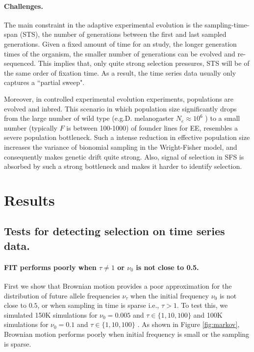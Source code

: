 \documentclass[11pt]{article}
\begin{document}
\paragraph{Challenges.}
The main constraint in the adaptive experimental evolution is the 
sampling-time-span (STS), the number of generations 
between the first and last sampled generations. Given a 
fixed amount of time for an study, the longer generation times of the organism, 
the smaller number of generations can be evolved and re-sequenced. 
This implies that, only quite strong selection pressures, STS will be of the 
same order of fixation time. As a result, the time series data usually only 
captures a ``partial sweep".

Moreover, in controlled experimental evolution experiments, populations are
evolved and 
inbred. This scenario in which population 
size 
significantly drops from the large number of wild type (e.g.D. melanogaster 
$N_e\approx10^6$ ) to a small number (typically $F$ is between 100-1000) of 
founder lines for EE, resembles a severe population bottleneck. 
Such a intense reduction in effective population size increases the variance of 
bionomial sampling in the Wright-Fisher model, and consequently makes genetic 
drift quite strong. Also, signal of selection in SFS is absorbed by such a 
strong bottleneck and makes it harder to identify selection.

\section{Results}
\subsection{Tests for detecting selection on time series data.}
\paragraph{FIT performs poorly when $\tau \neq 1$ or $\nu_0$ is not close to 
0.5.}
First we show that Brownian motion provides a poor 
approximation for the distribution of future allele frequencies $\nu_{\tau}$
when the initial frequency $\nu_0$ is not close to $0.5$, or when sampling in 
time is sparse i.e., 
$\tau>1$. 
To test this, we simulated 150K simulations for $\nu_0=0.005$ and 
$\tau\in\{1,10,100\}$ and 100K simulations for $\nu_0=0.1$ and 
$\tau\in\{1,10,100\}$ . As shown in Figure \ref{fig:markov}, Brownian motion 
performs poorly when initial frequency is small or the sampling is sparse.
\end{document}
